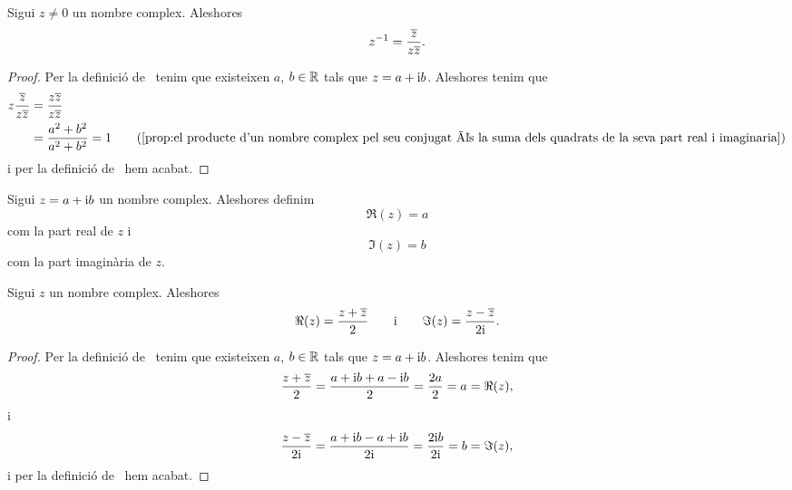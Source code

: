 \documentclass[../Apunts.tex]{subfiles}
\begin{document}
	\begin{proposition}
		\label{prop:inversa d'un nombre complex en funció del seu conjugat}
		Sigui \(z\neq0\) un nombre complex. Aleshores
		\[z^{-1}=\frac{\overline{z}}{z\overline{z}}.\]
		\begin{proof}
			Per la definició de~ tenim que existeixen \(a\), \(b\in\mathbb{R}\) tals que \(z=a+\mathrm{i} b\). Aleshores tenim que
			\begin{align*}
				z\frac{\conjugat{z}}{z\conjugat{z}}&=\frac{z\conjugat{z}}{z\conjugat{z}} \\
				&=\frac{a^{2}+b^{2}}{a^{2}+b^{2}}=1 \tag{\ref{prop:el producte d'un nombre complex pel seu conjugat és la suma dels quadrats de la seva part real i imaginaria}}
			\end{align*}
			i per la definició de~ hem acabat.
		\end{proof}
	\end{proposition}
	\begin{definition}
		\label{def:part real i part imaginària d'un nombre complex}
		\label{def:part real d'un nombre complex}
		\label{def:part imaginària d'un nombre complex}
		Sigui \(z=a+\mathrm{i} b\) un nombre complex. Aleshores definim
		\[\Re(z)=a\]
		com la part real de \(z\) i
		\[\Im(z)=b\]
		com la part imaginària de \(z\).
	\end{definition}
	\begin{proposition}
		\label{prop:fórmules per la part real i part imaginària d'un nombre complex}
		\label{prop:fórmula per la part real d'un nombre complex}
		\label{prop:fórmula per la part imaginària d'un nombre complex}
		Sigui \(z\) un nombre complex. Aleshores
		\[\Re(z)=\frac{z+\overline{z}}{2}\qquad\text{i}\qquad\Im(z)=\frac{z-\overline{z}}{2\mathrm{i}}.\]
		\begin{proof}
			Per la definició de~ tenim que existeixen \(a\), \(b\in\mathbb{R}\) tals que \(z=a+\mathrm{i} b\). Aleshores tenim que
			\[\frac{z+\overline{z}}{2}=\frac{a+\mathrm{i} b+a-\mathrm{i} b}{2}=\frac{2a}{2}=a=\Re(z),\]
			i
			\[\frac{z-\overline{z}}{2\mathrm{i}}=\frac{a+\mathrm{i} b-a+\mathrm{i} b}{2\mathrm{i}}=\frac{2\mathrm{i} b}{2\mathrm{i}}=b=\Im(z),\]
			i per la definició de~ hem acabat.
		\end{proof}
	\end{proposition}
\end{document}
